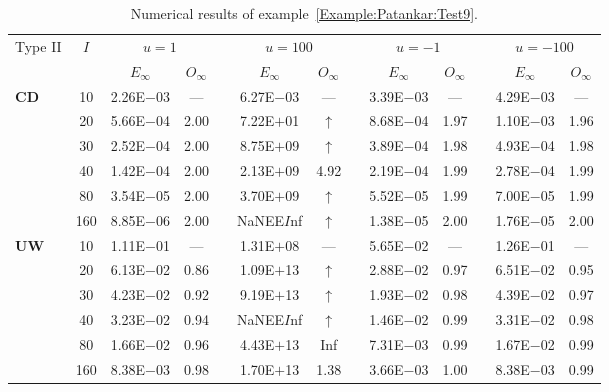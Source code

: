 {\renewcommand{\baselinestretch}{1.0}
\begin{table}[H]
\caption{Numerical results of example~\ref{Example:Patankar:Test9}.}

\footnotesize
\centering
\begin{tabular}{@{}l c c c c c c c c c c c c@{}}
\toprule
\multirow{2}{*}{Type II} & \multirow{2}{*}{$I$} & \multicolumn{2}{c}{$u=1$} & \multicolumn{1}{c}{} & \multicolumn{2}{c}{$u=100$} & \multicolumn{1}{c}{} & \multicolumn{2}{c}{$u=-1$} & \multicolumn{1}{c}{} & \multicolumn{2}{c}{$u=-100$}\\
\cline{3-4}
\cline{6-7}
\cline{9-10}
\cline{12-13}
&  & \multicolumn{1}{c}{$E_{\infty}$} & \multicolumn{1}{c}{$O_{\infty}$} & \multicolumn{1}{c}{} & \multicolumn{1}{c}{$E_{\infty}$} & \multicolumn{1}{c}{$O_{\infty}$} & \multicolumn{1}{c}{} & \multicolumn{1}{c}{$E_{\infty}$} & \multicolumn{1}{c}{$O_{\infty}$} & \multicolumn{1}{c}{} & \multicolumn{1}{c}{$E_{\infty}$} & \multicolumn{1}{c}{$O_{\infty}$}\\
\midrule
\multirow{6}{*}{\textbf{CD}}
& 10 & 2.26E$-$03 & --- &  & 6.27E$-$03 & --- &  & 3.39E$-$03 & --- &  & 4.29E$-$03 & ---\\
& 20 & 5.66E$-$04 & 2.00 &  & 7.22E$+$01 & $\uparrow$ &  & 8.68E$-$04 & 1.97 &  & 1.10E$-$03 & 1.96\\
& 30 & 2.52E$-$04 & 2.00 &  & 8.75E$+$09 & $\uparrow$ &  & 3.89E$-$04 & 1.98 &  & 4.93E$-$04 & 1.98\\
& 40 & 1.42E$-$04 & 2.00 &  & 2.13E$+$09 & 4.92 &  & 2.19E$-$04 & 1.99 &  & 2.78E$-$04 & 1.99\\
& 80 & 3.54E$-$05 & 2.00 &  & 3.70E$+$09 & $\uparrow$ &  & 5.52E$-$05 & 1.99 &  & 7.00E$-$05 & 1.99\\
& 160 & 8.85E$-$06 & 2.00 &  & NaNEE$I$nf & $\uparrow$ &  & 1.38E$-$05 & 2.00 &  & 1.76E$-$05 & 2.00\\
\midrule
\multirow{6}{*}{\textbf{UW}}
& 10 & 1.11E$-$01  & ---      &  & 1.31E$+$08 & ---                &  & 5.65E$-$02 & --- &  & 1.26E$-$01 & ---\\
& 20 & 6.13E$-$02  & 0.86  &  & 1.09E$+$13 & $\uparrow$ &  & 2.88E$-$02 & 0.97 &  & 6.51E$-$02 & 0.95\\
& 30 & 4.23E$-$02  & 0.92  &  & 9.19E$+$13 & $\uparrow$ &  & 1.93E$-$02 & 0.98 &  & 4.39E$-$02 & 0.97\\
& 40 & 3.23E$-$02  & 0.94  &  & NaNEE$I$nf & $\uparrow$ &  & 1.46E$-$02 & 0.99 &  & 3.31E$-$02 & 0.98\\
& 80 & 1.66E$-$02  & 0.96  &  & 4.43E$+$13 & Inf                &  & 7.31E$-$03 & 0.99 &  & 1.67E$-$02 & 0.99\\
& 160 & 8.38E$-$03 & 0.98 &  & 1.70E$+$13 & 1.38             &  & 3.66E$-$03 & 1.00 &  & 8.38E$-$03 & 0.99\\
\bottomrule
\end{tabular}
\label{Table:Patankar:Test9}
\end{table}}
